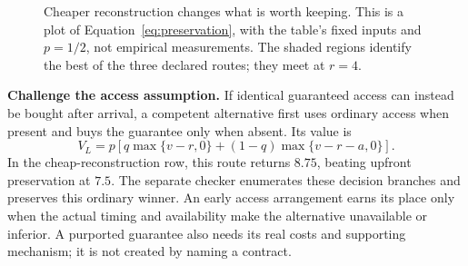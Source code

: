 \begin{figure}[htbp]
\centering
{}
\caption{Cheaper reconstruction changes what is worth keeping. This is a plot of Equation~\eqref{eq:preservation}, with the table's fixed inputs and $p=1/2$, not empirical measurements. The shaded regions identify the best of the three declared routes; they meet at $r=4$.}
\label{fig:preservation}
\end{figure}

\textbf{Challenge the access assumption.} If identical guaranteed access can instead be bought after arrival, a competent alternative first uses ordinary access when present and buys the guarantee only when absent. Its value is
\begin{equation}
V_L=p\left[q\max\{v-r,0\}+(1-q)\max\{v-r-a,0\}\right].
\label{eq:late-access}
\end{equation}
In the cheap-reconstruction row, this route returns $8.75$, beating upfront preservation at $7.5$. The separate checker enumerates these decision branches and preserves this ordinary winner. An early access arrangement earns its place only when the actual timing and availability make the alternative unavailable or inferior. A purported guarantee also needs its real costs and supporting mechanism; it is not created by naming a contract.

